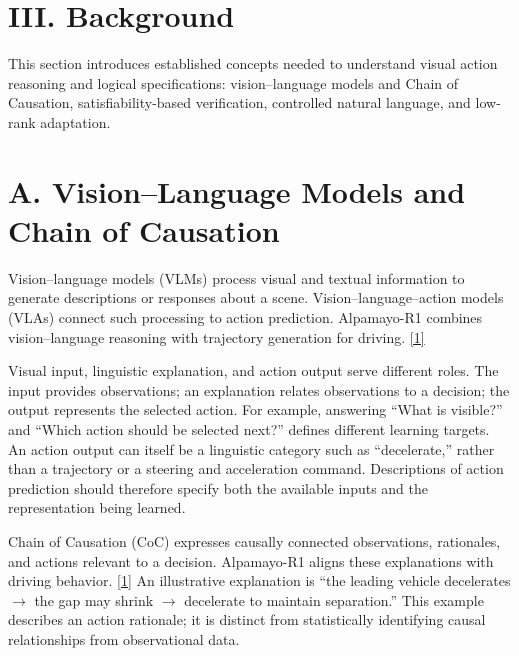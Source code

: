 \documentclass[11pt,a4paper]{article}
\begin{document}
\section*{III. Background}


This section introduces established concepts needed to understand visual action reasoning and logical specifications: vision–language models and Chain of Causation, satisfiability-based verification, controlled natural language, and low-rank adaptation.\par

\section*{A. Vision–Language Models and Chain of Causation}

Vision–language models (VLMs) process visual and textual information to generate descriptions or responses about a scene. Vision–language–action models (VLAs) connect such processing to action prediction. Alpamayo-R1 combines vision–language reasoning with trajectory generation for driving. \href{\detokenize{https://arxiv.org/abs/2511.00088}}{[1]}\par

Visual input, linguistic explanation, and action output serve different roles. The input provides observations; an explanation relates observations to a decision; the output represents the selected action. For example, answering “What is visible?” and “Which action should be selected next?” defines different learning targets. An action output can itself be a linguistic category such as “decelerate,” rather than a trajectory or a steering and acceleration command. Descriptions of action prediction should therefore specify both the available inputs and the representation being learned.\par

Chain of Causation (CoC) expresses causally connected observations, rationales, and actions relevant to a decision. Alpamayo-R1 aligns these explanations with driving behavior. \href{\detokenize{https://arxiv.org/abs/2511.00088}}{[1]} An illustrative explanation is “the leading vehicle decelerates \ensuremath{\rightarrow} the gap may shrink \ensuremath{\rightarrow} decelerate to maintain separation.” This example describes an action rationale; it is distinct from statistically identifying causal relationships from observational data.\par
\end{document}
